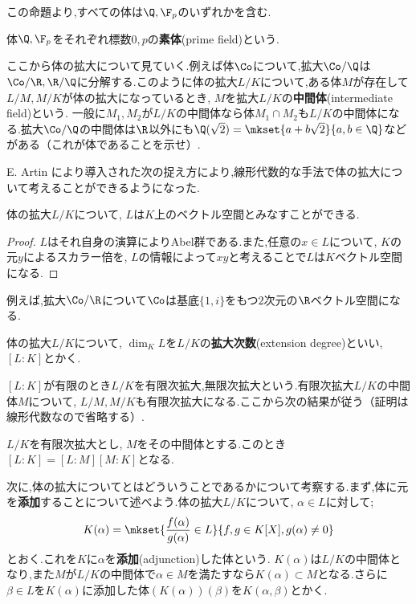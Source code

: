 この命題より,すべての体は$\Q, \F_p$のいずれかを含む.

\begin{defi}[素体]
	体$\Q,\F_p$をそれぞれ標数$0,p$の\textbf{素体}(prime field)という.
\end{defi}

ここから体の拡大について見ていく.例えば体$\Co$について,拡大$\Co/\Q$は$\Co/\R,\R/\Q$に分解する.このように体の拡大$L/K$について,ある体$M$が存在して$L/M,M/K$が体の拡大になっているとき, $M$を拡大$L/K$の\textbf{中間体}(intermediate field)という. 一般に$M_1,M_2$が$L/K$の中間体なら体$M_1\cap M_2$も$L/K$の中間体になる.拡大$\Co/\Q$の中間体は$\R$以外にも$\Q(\sqrt{2})=\mkset{a+b\sqrt{2}}{a,b\in\Q}$などがある（これが体であることを示せ）.

E. Artin により導入された次の捉え方により,線形代数的な手法で体の拡大について考えることができるようになった.

\begin{prop}
	体の拡大$L/K$について, $L$は$K$上のベクトル空間とみなすことができる.
\end{prop}

\begin{proof}
	$L$はそれ自身の演算によりAbel群である.また,任意の$x\in L$について, $K$の元$y$によるスカラー倍を, $L$の情報によって$xy$と考えることで$L$は$K$ベクトル空間になる.
\end{proof}

例えば,拡大$\Co/\R$について$\Co$は基底$\{1,i\}$をもつ$2$次元の$\R$ベクトル空間になる.

\begin{defi}[拡大次数]
	体の拡大$L/K$について, $\dim_K L$を$L/K$の\textbf{拡大次数}(extension degree)といい, $[L:K]$とかく.
\end{defi}

$[L:K]$が有限のとき$L/K$を有限次拡大,無限次拡大という.有限次拡大$L/K$の中間体$M$について, $L/M,M/K$も有限次拡大になる.ここから次の結果が従う（証明は線形代数なので省略する）.

\begin{prop}
	$L/K$を有限次拡大とし, $M$をその中間体とする.このとき$[L:K]=[L:M][M:K]$となる.
\end{prop}

次に,体の拡大についてとはどういうことであるかについて考察する.まず,体に元を\textbf{添加}することについて述べよう.体の拡大$L/K$について, $\alpha\in L$に対して;
\[K(\alpha)=\mkset{\frac{f(\alpha)}{g(\alpha)}\in L}{f,g\in K[X],g(\alpha)\neq0}\]
とおく.これを$K$に$\alpha$を\textbf{添加}(adjunction)した体という. $K(\alpha)$は$L/K$の中間体となり,また$M$が$L/K$の中間体で$\alpha\in M$を満たすなら$K(\alpha)\subset M$となる.さらに$\beta\in L$を$K(\alpha)$に添加した体$(K(\alpha))(\beta)$を$K(\alpha,\beta)$とかく.

